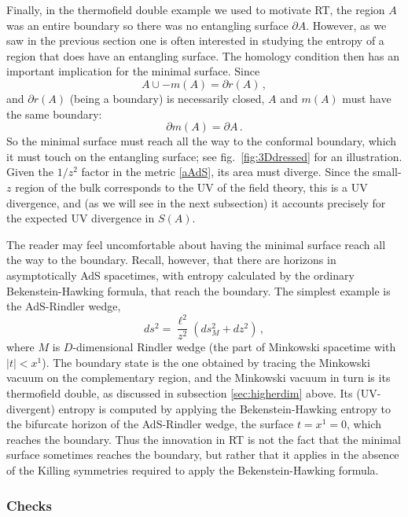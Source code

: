 \documentclass[11pt]{article}
\begin{document}
Finally, in the thermofield double example we used to motivate RT, the region $A$ was an entire boundary so there was no entangling surface $\partial A$. However, as we saw in the previous section one is often interested in studying the entropy of a region that does have an entangling surface. The homology condition then has an important implication for the minimal surface. Since
\begin{equation}\label{homology}
A\cup -m(A)= \partial r(A)\,, 
\end{equation}
and $\partial r(A)$ (being a boundary) is necessarily closed, $A$ and $m(A)$ must have the same boundary:
\begin{equation}\label{m(A) BC}
\partial m(A)=\partial A\,.
\end{equation}
So the minimal surface must reach all the way to the conformal boundary, which it must touch on the entangling surface; see fig.\ \ref{fig:3Ddressed} for an illustration. Given the $1/z^2$ factor in the metric \eqref{aAdS}, its area must diverge. Since the small-$z$ region of the bulk corresponds to the UV of the field theory, this is a UV divergence, and (as we will see in the next subsection) it accounts precisely for the expected UV divergence in $S(A)$.

The reader may feel uncomfortable about having the minimal surface reach all the way to the boundary. Recall, however, that there are horizons in asymptotically AdS spacetimes, with entropy calculated by the ordinary Bekenstein-Hawking formula, that reach the boundary. The simplest example is the AdS-Rindler wedge,
\begin{equation}
ds^2 = \frac{\ell^2}{z^2}(ds^2_M + dz^2)\,,
\end{equation}
where $M$ is $D$-dimensional Rindler wedge (the part of Minkowski spacetime with $|t|<x^1$). The boundary state is the one obtained by tracing the Minkowski vacuum on the complementary region, and the Minkowski vacuum in turn is its thermofield double, as discussed in subsection \ref{sec:higherdim} above. Its (UV-divergent) entropy is computed by applying the Bekenstein-Hawking entropy to the bifurcate horizon of the AdS-Rindler wedge, the surface $t=x^1=0$, which reaches the boundary. Thus the innovation in RT is not the fact that the minimal surface sometimes reaches the boundary, but rather that it applies in the absence of the Killing symmetries required to apply the Bekenstein-Hawking formula.
 

\subsubsection{Checks}
\end{document}
